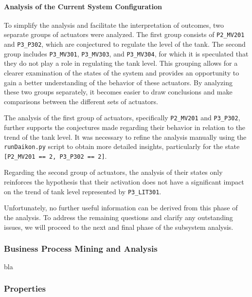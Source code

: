 \paragraph{Analysis of the Current System Configuration}
\label{par:6_P2P3_current_system_conf}
To simplify the analysis and facilitate the interpretation of outcomes, two separate groups of actuators were analyzed. The first group consists of \texttt{P2\_MV201} and \texttt{P3\_P302}, which are conjectured to regulate the level of the tank. The second group includes \texttt{P3\_MV301}, \texttt{P3\_MV303}, and \texttt{P3\_MV304}, for which it is speculated that they do not play a role in regulating the tank level. This grouping allows for a clearer examination of the states of the system and provides an opportunity to gain a better understanding of the behavior of these actuators. By analyzing these two groups separately, it becomes easier to draw conclusions and make comparisons between the different sets of actuators.

\bigskip
The analysis of the first group of actuators, specifically \texttt{P2\_MV201} and \texttt{P3\_P302}, further supports the conjectures made regarding their behavior in relation to the trend of the tank level. It was necessary to refine the analysis manually using the \texttt{runDaikon.py} script to obtain more detailed insights, particularly for the state \texttt{[P2\_MV201 == 2, P3\_P302 == 2]}. 

Regarding the second group of actuators, the analysis of their states only reinforces the hypothesis that their activation does not have a significant impact on the trend of tank level represented by \texttt{P3\_LIT301}. 

\bigskip
Unfortunately, no further useful information can be derived from this phase of the analysis. To address the remaining questions and clarify any outstanding issues, we will proceed to the next and final phase of the subsystem analysis.

\vfill

\subsubsection{Business Process Mining and Analysis}
\label{subsubsec:6_P2P3_bpa}

bla

\vfill

\subsubsection{Properties}
\label{subsubsec:6_P2P3_summary_table}

